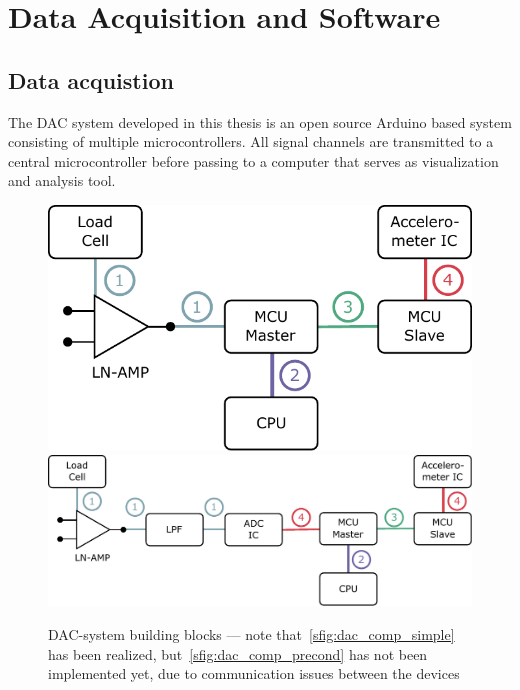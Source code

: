 \chapter{Data Acquisition and Software%
  \label{chap:\currfilebase}}


\section{Data acquistion}

The \ac{DAC} system developed in this thesis is an open source Arduino based system consisting of multiple microcontrollers. All signal channels are transmitted to a central microcontroller before passing to a computer that serves as visualization and analysis tool.

\begin{figure}[!htb]
  \centering
    {\includegraphics[scale=0.5]{figures/dac/dac_components/dac_comp_simple}}
    \hfill
    {\includegraphics[scale=0.5]{figures/dac/dac_components/dac_comp_precond}}
  \\[0.5em]
  \caption[DAC building blocks]{\acs{DAC}-system building blocks --- note that~\ref{sfig:dac_comp_simple} has been realized, but~\ref{sfig:dac_comp_precond} has not been implemented yet, due to communication issues between the devices%
    \label{fig:dac_building_blocks}}
\end{figure}

